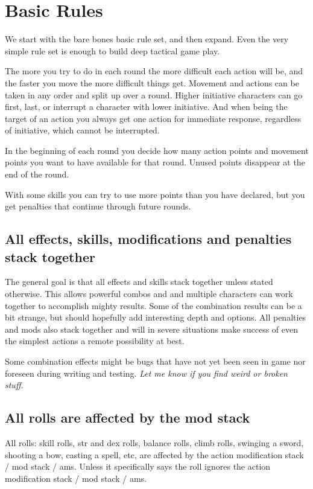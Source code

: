 
\section*{Basic Rules}
We start with the bare bones basic rule set, and then expand. Even the very simple rule set is enough to build deep tactical game play.

The more you try to do in each round the more difficult each action will be, and the faster you move the more difficult things get. Movement and actions can be taken in any order and split up over a round. Higher initiative characters can go first, last, or interrupt a character with lower initiative. And when being the target of an action you always get one action for immediate response, regardless of initiative, which cannot be interrupted.

In the beginning of each round you decide how many action points and movement points you want to have available for that round. Unused points disappear at the end of the round.

With some skills you can try to use more points than you have declared, but you get penalties that continue through future rounds.


\subsection*{All effects, skills, modifications and penalties stack together}
The general goal is that all effects and skills stack together unless stated otherwise. This allows powerful combos and and multiple characters can work together to accomplish mighty results. Some of the combination results can be a bit strange, but should hopefully add interesting depth and options.
All penalties and mods also stack together and will in severe situations make success of even the simplest actions a remote possibility at best.

Some combination effects might be bugs that have not yet been seen in game nor foreseen during writing and testing. \emph{Let me know if you find weird or broken stuff.}


\subsection*{All rolls are affected by the mod stack}
All rolls: skill rolls, str and dex rolls, balance rolls, climb rolls, swinging a sword, shooting a bow, casting a spell, etc, are affected by the action modification stack / mod stack / ams. Unless it specifically says the roll ignores the action modification stack / mod stack / ams.

